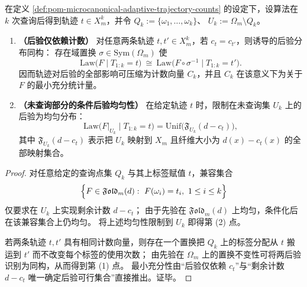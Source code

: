 \begin{theorem}[计数充分统计与后验均匀性]\label{thm:pom-microcanonical-count-sufficient-statistic-posterior-uniform}
在定义 \ref{def:pom-microcanonical-adaptive-trajectory-counts} 的设定下，设算法在 \(k\) 次查询后得到轨迹 \(t\in X_m^k\)，并令 \(Q_k:=\{\omega_1,\dots,\omega_k\}\)、
\(U_k:=\Omega_m\setminus Q_k\)。
\begin{enumerate}
  \item \textbf{（后验仅依赖计数）}
  对任意两条轨迹 \(t,t'\in X_m^k\)，若 \(c_t=c_{t'}\)，则诱导的后验分布同构：
  存在域置换 \(\sigma\in\mathrm{Sym}(\Omega_m)\) 使
  \[
  \mathrm{Law}\bigl(F\mid T_{1:k}=t\bigr)\ \cong\ \mathrm{Law}\bigl(F\circ\sigma^{-1}\mid T_{1:k}=t'\bigr).
  \]
  因而轨迹对后验的全部影响可压缩为计数向量 \(C_k\)，并且 \(C_k\) 在该意义下为关于 \(F\) 的最小充分统计量。
  \item \textbf{（未查询部分的条件后验均匀性）}
  在给定轨迹 \(t\) 时，限制在未查询集 \(U_k\) 上的后验为均匀分布：
  \[
  \mathrm{Law}\bigl(F|_{U_k}\mid T_{1:k}=t\bigr)
  =\mathrm{Unif}\bigl(\mathfrak{F}_{U_k}(d-c_t)\bigr),
  \]
  其中 \(\mathfrak{F}_{U_k}(d-c_t)\) 表示把 \(U_k\) 映射到 \(X_m\) 且纤维大小为 \(d(x)-c_t(x)\) 的全部映射集合。
\end{enumerate}
\end{theorem}
\begin{proof}
对任意给定的查询点集 \(Q_k\) 与其上标签赋值 \(t\)，兼容集合
\[
\Bigl\{F\in\mathfrak{Fold}_m(d):\ F(\omega_i)=t_i,\ 1\le i\le k\Bigr\}
\]
仅要求在 \(U_k\) 上实现剩余计数 \(d-c_t\)；
由于先验在 \(\mathfrak{Fold}_m(d)\) 上均匀，条件化后在该兼容集合上仍均匀。
将上述均匀性限制到 \(U_k\) 即得第 (2) 点。
\par
若两条轨迹 \(t,t'\) 具有相同计数向量，则存在一个置换把 \(Q_k\) 上的标签分配从 \(t\) 搬运到 \(t'\) 而不改变每个标签的使用次数；
由先验在 \(\Omega_m\) 上的置换不变性可将两后验识别为同构，从而得到第 (1) 点。
最小充分性由“后验仅依赖 \(c_t\)”与“剩余计数 \(d-c_t\) 唯一确定后验可行集合”直接推出。证毕。
\end{proof}

\endinput
